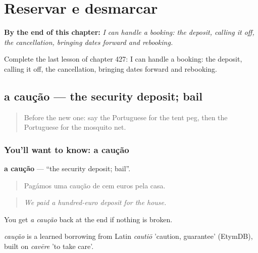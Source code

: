 
\chapter{Reservar e desmarcar}
\label{ch:pt-reservar-e-desmarcar}

\begin{chapteropening}
\textbf{By the end of this chapter:} \emph{I can handle a booking: the deposit, calling it off, the cancellation, bringing dates forward and rebooking.}

Complete the last lesson of chapter 427: I can handle a booking: the deposit, calling it off, the cancellation, bringing dates forward and rebooking.
\end{chapteropening}

\section[a caução]{a caução — the security deposit; bail}

\label{lesson:PT-C427-caucao}



\begin{quote}
Before the new one: say the Portuguese for the tent peg, then the Portuguese for the mosquito net.
\end{quote}

\subsection*{You'll want to know: a caução}
\textbf{a caução} — \textquotedblleft{}the security deposit; bail\textquotedblright{}.

\begin{quote}
Pagámos uma caução de cem euros pela casa.
\end{quote}

\begin{quote}
\emph{We paid a hundred-euro deposit for the house.}
\end{quote}

You get \emph{a caução} back at the end if nothing is broken.

\begin{cousinweb}
\emph{caução} is a learned borrowing from Latin \emph{cautiō} 'caution, guarantee' (EtymDB), built on \emph{cavēre} 'to take care'.
\end{cousinweb}

